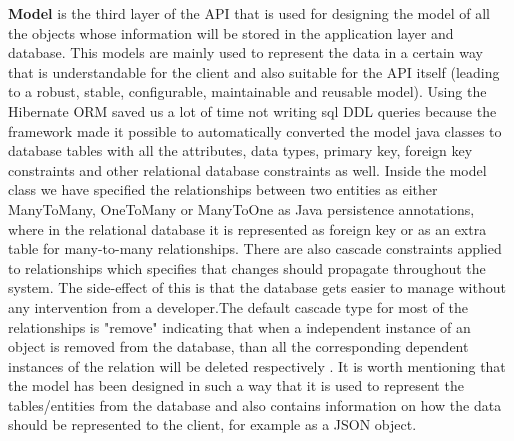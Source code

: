 \textbf{Model} is the third layer of the API that is used for designing the model of all the objects whose information will be stored in the application layer and database. This models are mainly used to represent the data in a certain way that is understandable for the client and also suitable for the API itself (leading to a robust, stable, configurable, maintainable and reusable model). Using the Hibernate ORM saved us a lot of time not writing sql DDL queries because the framework made it possible to automatically converted the model java classes to database tables with all the attributes, data types, primary key, foreign key constraints and other relational database constraints as well. Inside the model class we have specified the relationships between two entities as either ManyToMany, OneToMany or ManyToOne as Java persistence annotations, where in the relational database it is represented as foreign key or as an extra table for many-to-many relationships. There are also cascade constraints applied to relationships which specifies that changes should propagate throughout the system. The side-effect of this is that the database gets easier to manage without any intervention from a developer.The default cascade type for most of the relationships is "remove" indicating that when a independent instance of an object is removed from the database, than all the corresponding dependent instances of the relation will be deleted respectively \cite{CascadeTypeRef}. It is worth mentioning that the model has been designed in such a way that it is used to represent the tables/entities from the database and also contains information on how the data should be represented to the client, for example as a JSON object.

